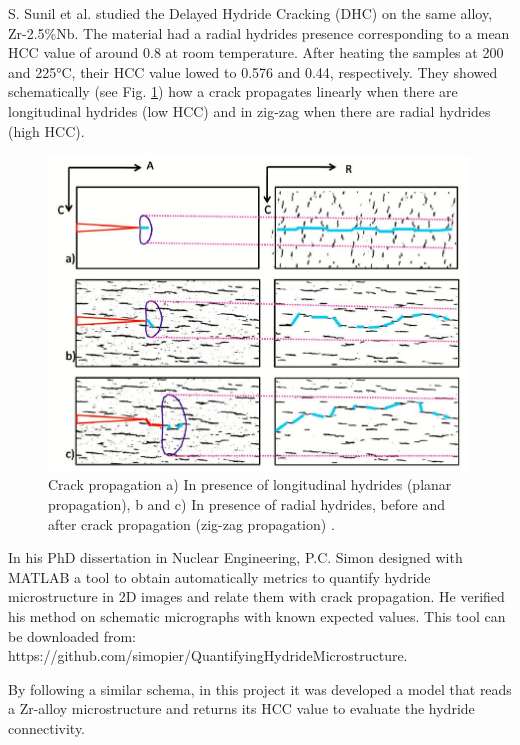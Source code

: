 \noindent
S. Sunil et al. \cite{SUNIL} studied the Delayed Hydride Cracking (DHC) on the same alloy, Zr-2.5\%Nb. The material had a radial hydrides presence corresponding to a mean HCC value of around 0.8 at room temperature. After heating the samples at 200 and 225°C, their HCC value lowed to 0.576 and 0.44, respectively. They showed schematically (see Fig. \ref{fig:ref3}) how a crack propagates linearly when there are longitudinal hydrides (low HCC) and in zig-zag when there are radial hydrides (high HCC).

\begin{figure}[h] %
    \centering
    \includegraphics[width=4.4in]{Figures/4-Lit. Review/propagation.JPG}
    \caption{Crack propagation a) In presence of longitudinal hydrides (planar propagation), b and c) In presence of radial hydrides, before and after crack propagation (zig-zag propagation)  \cite{SUNIL}.}
    \label{fig:ref3}
\end{figure}


\noindent
In his PhD dissertation in Nuclear Engineering, P.C. Simon \cite{thesis} designed with MATLAB a tool to obtain automatically metrics to quantify hydride microstructure in 2D images and relate them with crack propagation. He verified  his method on schematic micrographs with known expected values. This tool can be downloaded from: https://github.com/simopier/QuantifyingHydrideMicrostructure. 


\vspace{0.1 in}
\noindent
By following a similar schema, in this project it was developed a model that reads a Zr-alloy microstructure and  returns its HCC value to evaluate the hydride connectivity.

